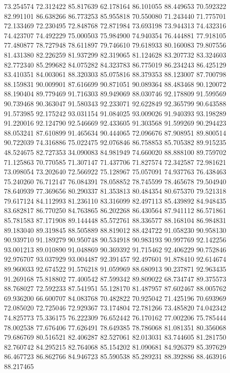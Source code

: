 73.254574
72.312422
85.817639
62.178164
86.101055
88.449653
70.592322
82.991101
86.638266
86.773253
85.955818
70.550080
71.243440
71.775701
72.133469
72.230495
72.848768
72.871984
73.693198
73.944313
74.432316
74.423707
74.492229
75.000503
75.984900
74.940354
76.444881
77.918105
77.480877
78.727948
78.611897
79.746610
79.618933
80.160083
79.807556
81.431380
82.226259
81.937299
82.319065
81.124628
83.207732
83.324603
82.772340
85.299682
84.075282
84.323783
86.775019
86.234243
86.425129
83.410351
84.003061
88.320303
85.075816
88.379353
88.123007
87.700798
88.159831
90.009901
87.616699
90.871051
90.089364
88.483468
90.120072
88.190404
89.779469
91.716303
89.949069
88.030746
92.178809
91.599569
90.739468
90.363047
91.580343
92.233071
92.622849
92.365799
90.643588
91.573985
92.175242
93.031154
91.084025
93.009026
91.940393
93.198289
91.220016
92.124790
92.546669
92.433605
91.303568
91.599269
90.294423
88.053241
87.610899
91.465634
90.444065
72.096676
87.908951
89.800514
90.722039
74.316886
75.022475
92.076846
86.758853
85.705382
89.915235
48.524675
82.727353
34.090083
84.981949
74.660020
88.888100
89.759702
71.125863
70.770585
71.307147
71.437706
71.827574
72.342587
72.981621
73.098054
73.202640
72.566922
75.128967
75.057091
74.937763
76.438463
75.240260
76.712147
76.084391
78.058852
78.745599
78.465678
79.504940
78.640939
77.369656
80.290337
81.353813
80.484354
80.675370
79.521318
79.617124
84.112993
81.236110
83.316099
82.497113
85.439892
84.948435
83.682817
86.770250
84.763865
86.202268
86.430564
87.941112
86.571861
85.781583
87.171908
89.144448
85.572761
88.336577
88.168104
86.984831
89.183040
89.319845
88.505889
88.819012
88.424722
91.058230
90.958130
90.939710
91.189279
90.950748
90.534918
90.983193
90.997769
92.142256
93.001213
89.010890
91.048869
90.369392
91.715462
92.406229
90.752846
92.976707
93.037929
93.004487
92.391457
92.497601
91.878410
92.614674
89.960033
92.674522
91.576218
91.059969
88.680913
90.237871
92.963435
91.269168
75.818802
77.400542
87.599342
89.809022
68.734747
89.375573
88.768027
72.592233
87.541951
55.128170
81.487957
87.602467
88.005762
69.936200
66.600707
84.083768
70.482822
70.925042
71.425196
70.693969
72.085020
72.725046
72.929367
73.174804
72.781266
73.485820
74.042342
74.825773
75.336175
76.222309
76.652442
76.170162
77.002206
75.785444
78.002538
77.676406
77.626491
78.649385
78.786068
81.081351
80.356068
79.686769
80.516521
82.406287
82.527061
82.013031
83.744605
81.281750
82.760742
84.295215
82.764068
85.154202
81.090681
84.926379
85.397629
86.467723
86.862766
84.946723
85.590538
85.289231
88.392886
88.463916
88.217465
